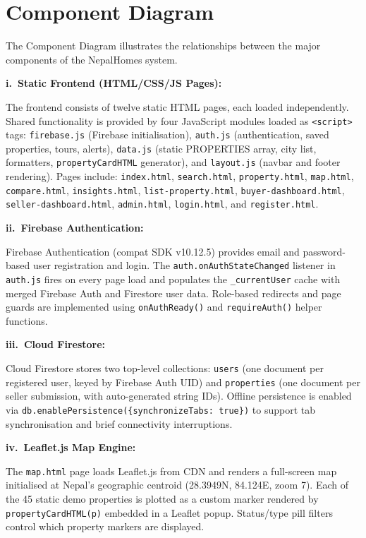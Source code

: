\documentclass[12pt,a4paper]{report}
\begin{document}
\section{Component Diagram}

The Component Diagram illustrates the relationships between the major components
of the NepalHomes system.

\noindent\textbf{i.\ Static Frontend (HTML/CSS/JS Pages):}

The frontend consists of twelve static HTML pages, each loaded independently.
Shared functionality is provided by four JavaScript modules loaded as
\texttt{<script>} tags: \texttt{firebase.js} (Firebase initialisation),
\texttt{auth.js} (authentication, saved properties, tours, alerts),
\texttt{data.js} (static PROPERTIES array, city list, formatters,
\texttt{propertyCardHTML} generator), and \texttt{layout.js} (navbar and footer
rendering). Pages include: \texttt{index.html}, \texttt{search.html},
\texttt{property.html}, \texttt{map.html}, \texttt{compare.html},
\texttt{insights.html}, \texttt{list-property.html},
\texttt{buyer-dashboard.html}, \texttt{seller-dashboard.html},
\texttt{admin.html}, \texttt{login.html}, and \texttt{register.html}.

\noindent\textbf{ii.\ Firebase Authentication:}

Firebase Authentication (compat SDK v10.12.5) provides email and password-based
user registration and login. The \texttt{auth.onAuthStateChanged} listener in
\texttt{auth.js} fires on every page load and populates the \texttt{\_currentUser}
cache with merged Firebase Auth and Firestore user data. Role-based redirects and
page guards are implemented using \texttt{onAuthReady()} and
\texttt{requireAuth()} helper functions.

\noindent\textbf{iii.\ Cloud Firestore:}

Cloud Firestore stores two top-level collections: \texttt{users} (one document
per registered user, keyed by Firebase Auth UID) and \texttt{properties} (one
document per seller submission, with auto-generated string IDs). Offline
persistence is enabled via \texttt{db.enablePersistence(\{synchronizeTabs:
true\})} to support tab synchronisation and brief connectivity interruptions.

\noindent\textbf{iv.\ Leaflet.js Map Engine:}

The \texttt{map.html} page loads Leaflet.js from CDN and renders a full-screen
map initialised at Nepal's geographic centroid (28.3949\textdegree N,
84.124\textdegree E, zoom 7). Each of the 45 static demo properties is plotted
as a custom marker rendered by \texttt{propertyCardHTML(p)} embedded in a Leaflet
popup. Status/type pill filters control which property markers are displayed.
\end{document}
